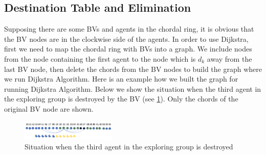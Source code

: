 \documentclass[conference]{IEEEtran}
\begin{document}
\subsection{Destination Table and Elimination}
Supposing there are some BVs and agents in the chordal ring, it is obvious that the BV nodes are in the clockwise side of the agents. In order to use Dijkstra, first we need to map the chordal ring with BVs into a graph. We include nodes from the node containing the first agent to the node which is $d_k$ away from the last BV node, then delete the chords from the BV nodes to build the graph where we run Dijkstra Algorithm.
Here is an example how we built the graph for running Dijkstra Algorithm. Below we show the situation when the third agent in the exploring group is destroyed by the BV (see \ref{fig:D1}). Only the chords of the original BV node are shown. 
\begin{figure}[H]
  \centering  
  \includegraphics[width=0.4\textwidth]{figures/D1.png}
  \caption{Situation when the third agent in the exploring group is destroyed}\label{fig:D1}
\end{figure} 
\end{document}
